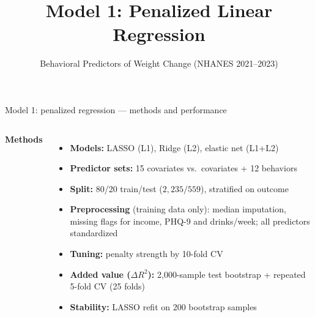 \documentclass[aspectratio=169,10pt]{beamer}
\title{Model 1: Penalized Linear Regression}
\subtitle{Behavioral Predictors of Weight Change (NHANES 2021--2023)}
\begin{document}
\begin{frame}{Model 1: penalized regression --- methods and performance}
\begin{columns}[T,onlytextwidth]
\small\textbf{Methods}\par\vspace{2pt}
{\footnotesize
\begin{itemize}\setlength\itemsep{1pt}\setlength\parskip{0pt}
  \item \textbf{Models:} LASSO (L1), Ridge (L2), elastic net (L1+L2)
  \item \textbf{Predictor sets:} 15 covariates vs.\ covariates + \alert{12 behaviors}
  \item \textbf{Split:} 80/20 train/test ($2{,}235 / 559$), stratified on outcome
  \item \textbf{Preprocessing} (training data only): median imputation, missing flags for income, PHQ-9 and drinks/week; all predictors standardized
  \item \textbf{Tuning:} penalty strength by 10-fold CV
  \item \textbf{Added value ($\Delta R^2$):} 2,000-sample test bootstrap + repeated 5-fold CV (25 folds)
  \item \textbf{Stability:} LASSO refit on 200 bootstrap samples
\end{itemize}}


\end{columns}
\end{frame}
\end{document}
